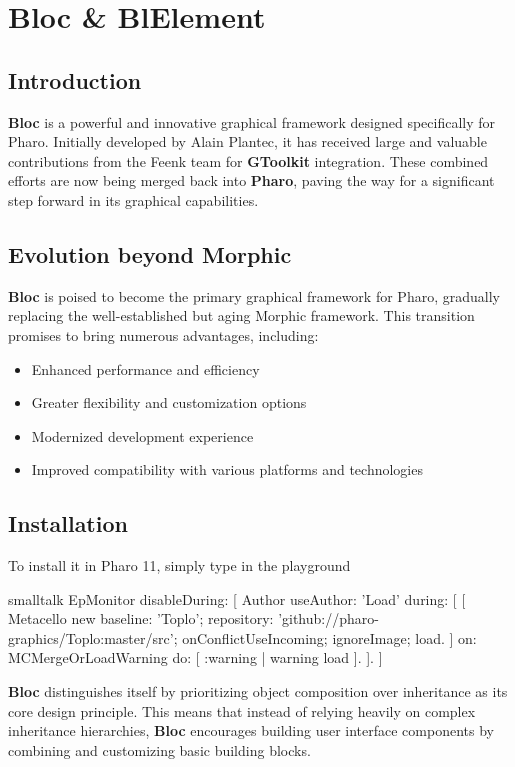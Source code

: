 \documentclass[10pt,twoside,english]{_support/latex/sbabook/sbabook}
\begin{document}
\chapter{Bloc \& BlElement}
\section{Introduction}
\textbf{Bloc} is a powerful and innovative graphical framework designed specifically
for Pharo. Initially developed by Alain Plantec, it has received large and valuable
contributions from the Feenk team for \textbf{GToolkit} integration. These combined
efforts are now being merged back into \textbf{Pharo}, paving the way for a
significant step forward in its graphical capabilities.

\section{Evolution beyond Morphic}
\textbf{Bloc} is poised to become the primary graphical framework for Pharo,
gradually replacing the well-established but aging Morphic framework. This
transition promises to bring numerous advantages, including:

\begin{itemize}
    \item Enhanced performance and efficiency
    \item Greater flexibility and customization options
    \item Modernized development experience
    \item Improved compatibility with various platforms and technologies
\end{itemize}

\section{Installation}
To install it in Pharo 11, simply type in the playground
\begin{displaycode}{smalltalk}
EpMonitor disableDuring: [
  Author useAuthor: 'Load' during: [
    [ Metacello new baseline: 'Toplo'; repository: 'github://pharo-graphics/Toplo:master/src';
        onConflictUseIncoming;
        ignoreImage;
        load.
    ] on: MCMergeOrLoadWarning do: [ :warning | warning load ].
  ].
]
\end{displaycode}

\textbf{Bloc} distinguishes itself by prioritizing object composition over
inheritance as its core design principle. This means that instead of relying
heavily on complex inheritance hierarchies, \textbf{Bloc} encourages building user
interface components by combining and customizing basic building blocks.
\end{document}
